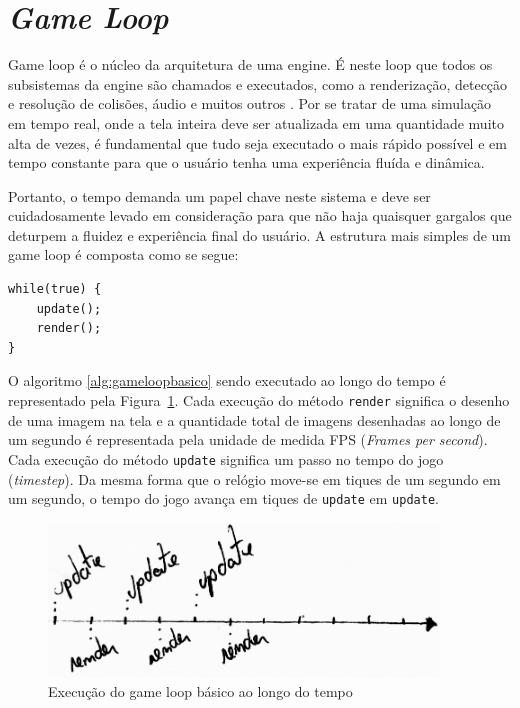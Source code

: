 \documentclass[12pt, 
openright, 
oneside, 
a4paper,    
brazil]{facom-ufu-abntex2}
\begin{document}
\section{\textit{Game Loop}}
Game loop é o núcleo da arquitetura de uma engine. É neste loop que todos os subsistemas da engine são chamados e  executados, como a renderização, detecção e resolução de colisões, áudio e muitos outros \cite{GameEngineArchitecture}. Por se tratar de uma simulação em tempo real, onde a tela inteira deve ser atualizada em uma quantidade muito alta de vezes, é fundamental que tudo seja executado o mais rápido possível e em tempo constante para que o usuário tenha uma experiência fluída e dinâmica.

Portanto, o tempo demanda um papel chave neste sistema e deve ser cuidadosamente levado em consideração para que não haja quaisquer gargalos que deturpem a fluidez e experiência final do usuário. A estrutura mais simples de um game loop é composta como se segue:

\begin{lstlisting}[caption={Estrutura básica do Game Loop}, label={alg:gameloopbasico}]
while(true) {
	update();
	render();
}
\end{lstlisting}


O algoritmo \ref{alg:gameloopbasico} sendo executado ao longo do tempo é representado pela Figura~\ref{fig:gameloopbasico}.
Cada execução do método \texttt{render} significa o desenho de uma imagem na tela e a quantidade total de imagens desenhadas ao longo de um segundo é representada pela unidade de medida FPS (\textit{Frames per second}). Cada execução do método \texttt{update} significa um passo no tempo do jogo (\textit{timestep}). Da mesma forma que o relógio move-se em tiques de um segundo em um segundo, o tempo do jogo avança em tiques de \texttt{update} em \texttt{update}.

\begin{figure}[H]
	\centering
	\includegraphics[width=28em]{imagens/ilu1_small.png}
	\caption{Execução do game loop básico ao longo do tempo\label{fig:gameloopbasico}}
\end{figure}
\end{document}
